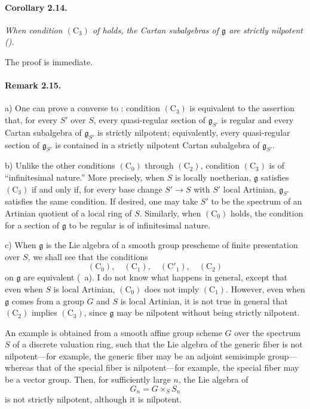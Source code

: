 
\paragraph{\textbf{Corollary 2.14.}}
\emph{When condition \((\mathrm C_3)\) of  holds, the Cartan
subalgebras of \(\mathfrak g\) are strictly nilpotent
\textup{()}.}

The proof is immediate.

\paragraph{\textbf{Remark 2.15.}}
\noindent
\textup{a)}
One can prove a converse to : condition \((\mathrm C_3)\) is
equivalent to the assertion that, for every \(S'\) over \(S\),
every quasi-regular section of \(\mathfrak g_{S'}\) is regular and
every Cartan subalgebra of \(\mathfrak g_{S'}\) is strictly
nilpotent; equivalently, every quasi-regular section of
\(\mathfrak g_{S'}\) is contained in a strictly nilpotent Cartan
subalgebra of \(\mathfrak g_{S'}\).

\smallskip
\noindent
\textup{b)}
Unlike the other conditions \((\mathrm C_0)\) through
\((\mathrm C_2)\), condition \((\mathrm C_3)\) is of
``infinitesimal nature.'' More precisely, when \(S\) is locally
noetherian, \(\mathfrak g\) satisfies \((\mathrm C_3)\) if and only
if, for every base change \(S'\to S\) with \(S'\) local Artinian,
\(\mathfrak g_{S'}\) satisfies the same condition. If desired, one
may take \(S'\) to be the spectrum of an Artinian quotient of a
local ring of \(S\). Similarly, when \((\mathrm C_0)\) holds, the
condition for a section of \(\mathfrak g\) to be regular is of
infinitesimal nature.

\smallskip
\noindent
\textup{c)}
When \(\mathfrak g\) is the Lie algebra of a smooth group
prescheme of finite presentation over \(S\), we shall see that the
conditions
\[
  (\mathrm C_0),\quad(\mathrm C_1),\quad
  (\mathrm C'_1),\quad(\mathrm C_2)
\]
on \(\mathfrak g\) are equivalent \textup{(~a)}. I do not know
what happens in general, except that even when \(S\) is local
Artinian, \((\mathrm C_0)\) does not imply \((\mathrm C_1)\).
However, even when \(\mathfrak g\) comes from a group \(G\) and
\(S\) is local Artinian, it is not true in general that
\((\mathrm C_2)\) implies \((\mathrm C_3)\), since
\(\mathfrak g\) may be nilpotent without being strictly
nilpotent.

An example is obtained from a smooth affine group scheme \(G\)
over the spectrum \(S\) of a discrete valuation ring, such that
the Lie algebra of the generic fiber is not nilpotent---for
example, the generic fiber may be an adjoint semisimple
group---whereas that of the special fiber is nilpotent---for
example, the special fiber may be a vector group. Then, for
sufficiently large \(n\), the Lie algebra of
\[
  G_n=G\times_S S_n
\]
is not strictly nilpotent, although it is nilpotent.
